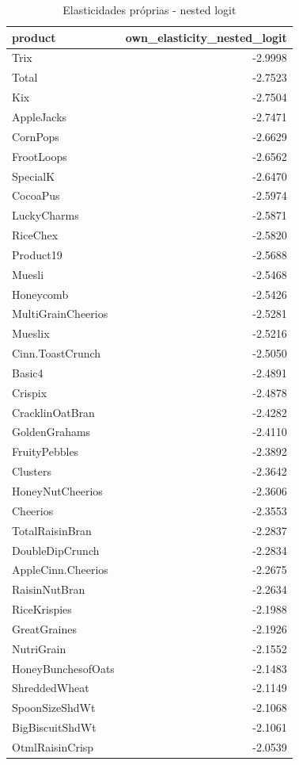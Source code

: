 \begin{table}[!htbp]
\centering
\caption{Elasticidades próprias - nested logit}
\label{tab:own-elas-nested}
\small
\begin{tabular}{lr}
\toprule
product & own_elasticity_nested_logit \\
\midrule
Trix & -2.9998 \\
Total & -2.7523 \\
Kix & -2.7504 \\
AppleJacks & -2.7471 \\
CornPops & -2.6629 \\
FrootLoops & -2.6562 \\
SpecialK & -2.6470 \\
CocoaPus & -2.5974 \\
LuckyCharms & -2.5871 \\
RiceChex & -2.5820 \\
Product19 & -2.5688 \\
Muesli & -2.5468 \\
Honeycomb & -2.5426 \\
MultiGrainCheerios & -2.5281 \\
Mueslix & -2.5216 \\
Cinn.ToastCrunch & -2.5050 \\
Basic4 & -2.4891 \\
Crispix & -2.4878 \\
CracklinOatBran & -2.4282 \\
GoldenGrahams & -2.4110 \\
FruityPebbles & -2.3892 \\
Clusters & -2.3642 \\
HoneyNutCheerios & -2.3606 \\
Cheerios & -2.3553 \\
TotalRaisinBran & -2.2837 \\
DoubleDipCrunch & -2.2834 \\
AppleCinn.Cheerios & -2.2675 \\
RaisinNutBran & -2.2634 \\
RiceKrispies & -2.1988 \\
GreatGraines & -2.1926 \\
NutriGrain & -2.1552 \\
HoneyBunchesofOats & -2.1483 \\
ShreddedWheat & -2.1149 \\
SpoonSizeShdWt & -2.1068 \\
BigBiscuitShdWt & -2.1061 \\
OtmlRaisinCrisp & -2.0539 \\

\end{tabular}
\end{table}
